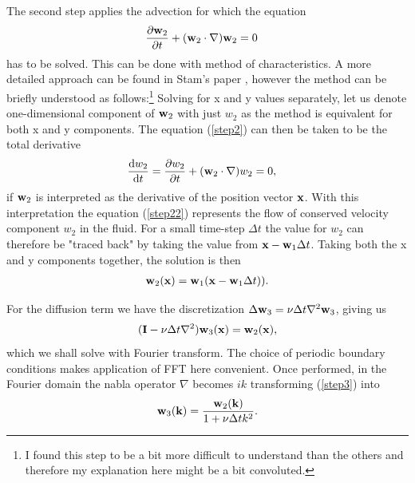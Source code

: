 \documentclass[12pt, letterpaper]{article}
\begin{document}
The second step applies the advection for which the equation 
\begin{align}
  \frac{\partial\vb{w}_{2}}{\partial t} + (\vb{w}_{2}\cdot\nabla)\vb{w}_{2} &= 0\label{step2}
\end{align}
has to be solved.
This can be done with method of characteristics.
A more detailed approach can be found in Stam's paper \cite{Stam2}, however the method can be briefly understood as follows:\footnote{I found this step to be a bit more difficult to understand than the others and therefore my explanation here might be a bit convoluted.}
Solving for x and y values separately, let us denote one-dimensional component of $\vb{w}_{2}$ with just $w_{2}$ as the method is equivalent for both x and y components.
The equation (\ref{step2}) can then be taken to be the total derivative 
\begin{align}
  \frac{\dd w_{2}}{\dd t}
  &=\frac{\partial{w}_{2}}{\partial t} + (\vb{w}_{2}\cdot\nabla){w}_{2} = 0,\label{step22}
\end{align}
if $\vb{w}_{2}$ is interpreted as the derivative of the position vector $\vb{x}$.
With this interpretation the equation (\ref{step22}) represents the flow of conserved velocity component $w_{2}$ in the fluid.
For a small time-step $\Delta t$ the value for $w_{2}$ can therefore be "traced back" by taking the value from $\vb{x}-\vb{w}_{1} \Delta t$.
Taking both the x and y components together, the solution is then
\begin{align*}
  \vb{w}_{2} (\vb{x}) = \vb{w}_{1}(\vb{x}-\vb{w}_{1}\Delta t)).
\end{align*}


For the diffusion term we have the discretization
  $\Delta \vb{w}_{3} = \nu \Delta t\nabla^{2}\vb{w}_{3}$,
giving us
\begin{align}
  (\vb{I}-\nu\Delta t \nabla^{2})\vb{w}_{3} (\vb{x}) = \vb{w}_{2}(\vb{x})\label{step3},
\end{align}
which we shall solve with Fourier transform.
The choice of periodic boundary conditions makes application of FFT here convenient.
Once performed, in the Fourier domain the nabla operator $\nabla$ becomes $ik$ transforming (\ref{step3}) into
\begin{align*}
  \vb{w}_{3} (\vb{k}) = \frac{\vb{w}_{2}(\vb{k})}{1+\nu\Delta t k^{2}} .
\end{align*}
\end{document}
